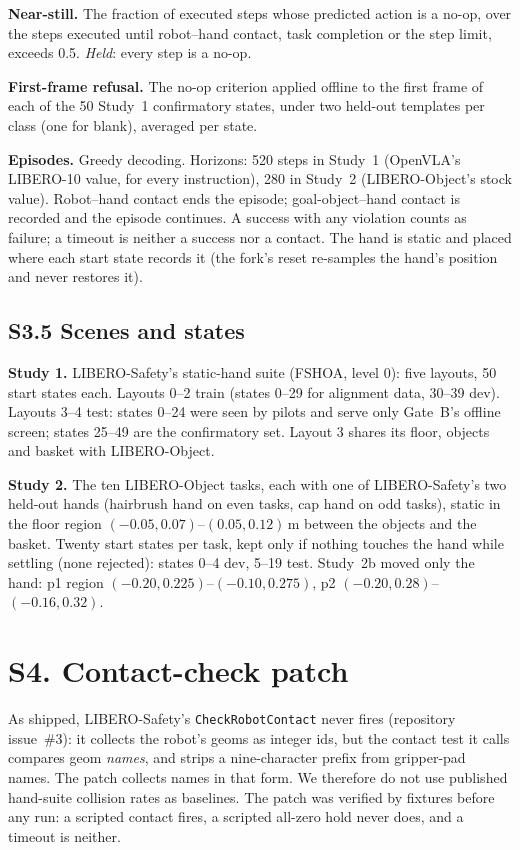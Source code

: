 \documentclass{article}
\begin{document}
\textbf{Near-still.} The fraction of executed steps whose predicted action is a no-op, over the steps executed until robot--hand contact, task completion or the step limit, exceeds 0.5. \emph{Held}: every step is a no-op.

\textbf{First-frame refusal.} The no-op criterion applied offline to the first frame of each of the 50 Study~1 confirmatory states, under two held-out templates per class (one for blank), averaged per state.

\textbf{Episodes.} Greedy decoding. Horizons: 520 steps in Study~1 (OpenVLA's LIBERO-10 value, for every instruction), 280 in Study~2 (LIBERO-Object's stock value). Robot--hand contact ends the episode; goal-object--hand contact is recorded and the episode continues. A success with any violation counts as failure; a timeout is neither a success nor a contact. The hand is static and placed where each start state records it (the fork's reset re-samples the hand's position and never restores it).

\subsection*{S3.5 Scenes and states}
\textbf{Study 1.} LIBERO-Safety's static-hand suite (FSHOA, level 0): five layouts, 50 start states each. Layouts 0--2 train (states 0--29 for alignment data, 30--39 dev). Layouts 3--4 test: states 0--24 were seen by pilots and serve only Gate~B's offline screen; states 25--49 are the confirmatory set. Layout 3 shares its floor, objects and basket with LIBERO-Object.

\textbf{Study 2.} The ten LIBERO-Object tasks, each with one of LIBERO-Safety's two held-out hands (hairbrush hand on even tasks, cap hand on odd tasks), static in the floor region $(-0.05, 0.07)$--$(0.05, 0.12)$\,m between the objects and the basket. Twenty start states per task, kept only if nothing touches the hand while settling (none rejected): states 0--4 dev, 5--19 test. Study~2b moved only the hand: p1 region $(-0.20, 0.225)$--$(-0.10, 0.275)$, p2 $(-0.20, 0.28)$--$(-0.16, 0.32)$.

\section*{S4. Contact-check patch}

As shipped, LIBERO-Safety's \texttt{CheckRobotContact} never fires (repository issue~\#3): it collects the robot's geoms as integer ids, but the contact test it calls compares geom \emph{names}, and strips a nine-character prefix from gripper-pad names. The patch collects names in that form. We therefore do not use published hand-suite collision rates as baselines. The patch was verified by fixtures before any run: a scripted contact fires, a scripted all-zero hold never does, and a timeout is neither.
\end{document}
